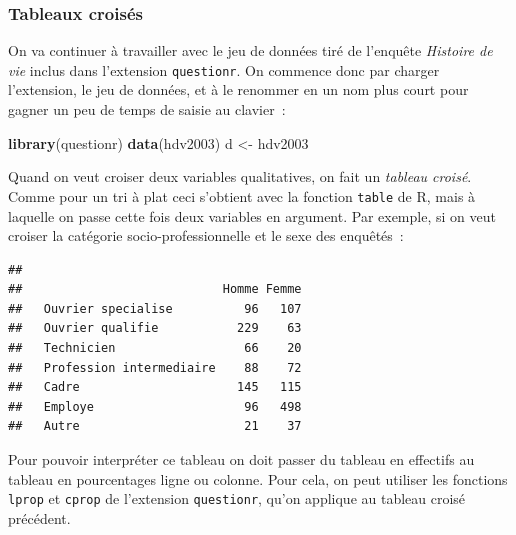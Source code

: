 \documentclass[
  12pt,
]{book}
\newenvironment{Shaded}{\begin{snugshade}}{\end{snugshade}}
\newcommand{\KeywordTok}[1]{\textcolor[rgb]{0.13,0.29,0.53}{\textbf{#1}}}
\newcommand{\NormalTok}[1]{#1}
\newcommand{\OperatorTok}[1]{\textcolor[rgb]{0.81,0.36,0.00}{\textbf{#1}}}
\newcommand{\StringTok}[1]{\textcolor[rgb]{0.31,0.60,0.02}{#1}}
\begin{document}
\hypertarget{tableaux-croisuxe9s}{%
\subsubsection{Tableaux croisés}\label{tableaux-croisuxe9s}}

On va continuer à travailler avec le jeu de données tiré de l'enquête \emph{Histoire de vie} inclus dans l'extension \texttt{questionr}. On commence donc par charger l'extension, le jeu de données, et à le renommer en un nom plus court pour gagner un peu de temps de saisie au clavier~:

\begin{Shaded}
\begin{Highlighting}[]
\KeywordTok{library}\NormalTok{(questionr)}
\KeywordTok{data}\NormalTok{(hdv2003)}
\NormalTok{d \textless{}{-}}\StringTok{ }\NormalTok{hdv2003}
\end{Highlighting}
\end{Shaded}

Quand on veut croiser deux variables qualitatives, on fait un \emph{tableau croisé}. Comme pour un tri à plat ceci s'obtient avec la fonction \texttt{table} de R, mais à laquelle on passe cette fois deux variables en argument. Par exemple, si on veut croiser la catégorie socio-professionnelle et le sexe des enquêtés~:

\begin{Shaded}
\end{Shaded}

\begin{verbatim}
##                           
##                            Homme Femme
##   Ouvrier specialise          96   107
##   Ouvrier qualifie           229    63
##   Technicien                  66    20
##   Profession intermediaire    88    72
##   Cadre                      145   115
##   Employe                     96   498
##   Autre                       21    37
\end{verbatim}

Pour pouvoir interpréter ce tableau on doit passer du tableau en effectifs au tableau en pourcentages ligne ou colonne. Pour cela, on peut utiliser les fonctions \texttt{lprop} et \texttt{cprop} de l'extension \texttt{questionr}, qu'on applique au tableau croisé précédent.
\end{document}

